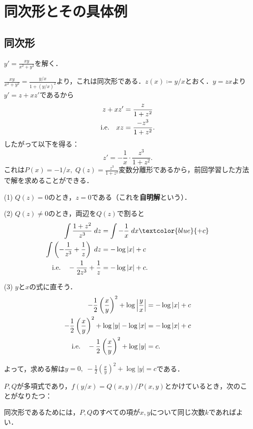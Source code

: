 \section{同次形とその具体例} %
\subsection{同次形}
\begin{example}
    $y'=\frac{xy}{x^2+y^2}$を解く．

    $\frac{xy}{x^2+y^2}=\frac{y/x}{1+(y/x)^2}$より，これは同次形である．$z(x) \coloneqq y/x$とおく．$y=zx$より$y'=z+xz'$であるから
    \begin{align*}
        z+xz' &= \frac{z}{1+z^2} \\
        \text{i.e.} \quad xz &= \frac{-z^3}{1+z^2}.
    \end{align*}
    したがって以下を得る：
    \[ z' = -\frac{1}{x} \cdot \frac{z^3}{1+z^2}.\]
    これは$P(x)=-1/x, \; Q(z)=\frac{z^3}{1+z^2}$変数分離形であるから，前回学習した方法で解を求めることができる．

    (1) $Q(z)=0$のとき，$z=0$である（これを\textbf{自明解}という）．

    (2) $Q(z) \neq 0$のとき，両辺を$Q(z)$で割ると
    \begin{align*}
        \int \frac{1+z^2}{z^3} \; dz &= \int -\frac{1}{x} \; dx \textcolor{blue}{+c} \\
        \int \left(-\frac{1}{z^3} + \frac{1}{z}\right) \; dz &= -\log |x| + c \\
        \ie \quad -\frac{1}{2z^3} + \frac{1}{z} &= -\log |x| + c.
    \end{align*}

    (3) $y$と$x$の式に直そう．
    \begin{align*}
        -\frac{1}{2}\left(\frac{x}{y}\right)^2 + \log \left|\frac{y}{x}\right| &= -\log |x| + c \\
        -\frac{1}{2}\left(\frac{x}{y}\right)^2 + \log |y| - \log |x| &= -\log |x| + c \\
        \text{i.e.} \quad -\frac{1}{2}\left(\frac{x}{y}\right)^2 + \log |y| &= c.
    \end{align*}

    よって，求める解は$y=0, \; -\frac{1}{2}\left(\frac{x}{y}\right)^2+\log |y| =c$である．
\end{example}

$P,Q$が多項式であり，$f\left(y/x\right) = Q(x,y)/P(x,y)$とかけているとき，次のことがなりたつ：
\begin{claim*}
    同次形であるためには，$P,Q$のすべての項が$x,y$について同じ次数$k$であればよい．
\end{claim*}

